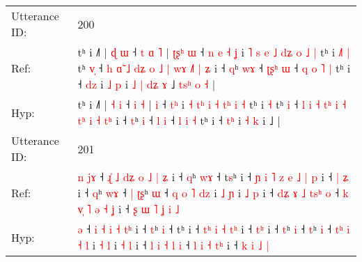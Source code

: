 \documentclass[10pt]{article}
\DeclareRobustCommand{\hl}[1]{{\textcolor{red}{#1}}}
\begin{document}
\begin{longtable}{ll}
 \\
\midrule
Utterance ID: & 200 \\
Ref: & tʰ i ˩˥ | \hl{ɖ} \hl{ɯ} ˧\hl{ }\hl{t} \hl{ɑ} \hl{˥} |\hl{ }\hl{ʈ}\hl{ʂ}\hl{ʰ} \hl{ɯ} ˧\hl{ }\hl{n}\hl{ }\hl{e} \hl{˧}\hl{ }\hl{ʝ} i \hl{˥} \hl{s}\hl{ }\hl{e} \hl{˩} \hl{d}\hl{ʑ}\hl{ }\hl{o} \hl{˩} \hl{|} tʰ i\hl{ }\hl{˩}\hl{˥} \hl{|} tʰ \hl{v}\hl{̩} ˧ \hl{h} \hl{ɑ}\hl{̃} \hl{˩} \hl{d}\hl{ʑ} \hl{o} \hl{˩} \hl{|}\hl{ }\hl{w}\hl{ɤ} \hl{˩}\hl{˥} \hl{|}\hl{ }\hl{ʑ} i ˧ \hl{q}ʰ \hl{w}\hl{ɤ} ˧ \hl{ʈ}\hl{ʂ}\hl{ʰ} \hl{ɯ} ˧\hl{ }\hl{q} \hl{o} \hl{˥} \hl{|} tʰ i ˧ \hl{d}\hl{z} i \hl{˩} \hl{p} i\hl{ }\hl{˩}\hl{ }\hl{|}\hl{ }\hl{d}\hl{ʑ}\hl{ }\hl{ɤ} ˩\hl{ }\hl{t}\hl{s}\hl{ʰ}\hl{ }\hl{o}\hl{ }\hl{˧} |
 \\
Hyp: & tʰ i ˩˥ | \hl{˧} \hl{i} ˧\hl{}\hl{} \hl{i} \hl{˧} |\hl{}\hl{}\hl{}\hl{} \hl{i} ˧\hl{}\hl{}\hl{}\hl{} \hl{}\hl{t}\hl{ʰ} i \hl{˧} \hl{}\hl{t}\hl{ʰ} \hl{i} \hl{˧}\hl{ }\hl{t}\hl{ʰ} \hl{i} \hl{˧} tʰ i\hl{}\hl{}\hl{} \hl{˧} tʰ \hl{}\hl{i} ˧ \hl{l} \hl{}\hl{i} \hl{˧} \hl{t}\hl{ʰ} \hl{i} \hl{˧} \hl{t}\hl{ʰ}\hl{ }\hl{i} \hl{}\hl{˧} \hl{}\hl{t}\hl{ʰ} i ˧ \hl{t}ʰ \hl{}\hl{i} ˧ \hl{}\hl{}\hl{l} \hl{i} ˧\hl{}\hl{} \hl{l} \hl{i} \hl{˧} tʰ i ˧ \hl{t}\hl{ʰ} i \hl{˧} \hl{k} i\hl{}\hl{}\hl{}\hl{}\hl{}\hl{}\hl{}\hl{}\hl{} ˩\hl{}\hl{}\hl{}\hl{}\hl{}\hl{}\hl{}\hl{} |
 \\
\midrule
Utterance ID: & 201 \\
Ref: & \hl{n}\hl{ }\hl{j}\hl{ɤ} ˧\hl{ }\hl{ɻ}\hl{̍} \hl{˩} \hl{d}\hl{ʑ} \hl{o} \hl{˩} \hl{|}\hl{ }\hl{ʑ} i ˧ \hl{q}ʰ \hl{w}\hl{ɤ} ˧ t\hl{s}ʰ i ˧\hl{ }\hl{ɲ}\hl{ }\hl{i} \hl{˥}\hl{ }\hl{z} \hl{e} \hl{˩} \hl{|}\hl{ }\hl{p} i ˧ \hl{|}\hl{ }\hl{ʑ} i ˧ \hl{q}ʰ \hl{w}\hl{ɤ} ˧\hl{ }\hl{|} \hl{ʈ}\hl{ʂ}ʰ \hl{ɯ} ˧ \hl{}\hl{q} \hl{o} \hl{˥} \hl{d}\hl{z} i \hl{˩} \hl{ɲ} i \hl{˩} \hl{p} i ˧ \hl{d}\hl{ʑ} \hl{ɤ} \hl{˩} \hl{t}\hl{s}\hl{ʰ} \hl{o} ˧\hl{ }\hl{k} \hl{v}\hl{̩} \hl{˥} \hl{ə} \hl{˧}\hl{ }\hl{ʝ} i ˧\hl{ }\hl{ʂ}\hl{ }\hl{ɯ} \hl{˥} \hl{ʝ} \hl{i} \hl{˩}
 \\
Hyp: & \hl{}\hl{}\hl{}\hl{ə} ˧\hl{}\hl{}\hl{} \hl{i} \hl{}\hl{˧} \hl{i} \hl{˧} \hl{}\hl{t}\hl{ʰ} i ˧ \hl{t}ʰ \hl{}\hl{i} ˧ t\hl{}ʰ i ˧\hl{}\hl{}\hl{}\hl{} \hl{}\hl{t}\hl{ʰ} \hl{i} \hl{˧} \hl{}\hl{t}\hl{ʰ} i ˧ \hl{}\hl{t}\hl{ʰ} i ˧ \hl{t}ʰ \hl{}\hl{i} ˧\hl{}\hl{} \hl{}\hl{t}ʰ \hl{i} ˧ \hl{t}\hl{ʰ} \hl{i} \hl{˧} \hl{}\hl{l} i \hl{˧} \hl{l} i \hl{˧} \hl{l} i ˧ \hl{}\hl{l} \hl{i} \hl{˧} \hl{}\hl{}\hl{l} \hl{i} ˧\hl{}\hl{} \hl{}\hl{l} \hl{i} \hl{˧} \hl{}\hl{t}\hl{ʰ} i ˧\hl{}\hl{}\hl{}\hl{} \hl{k} \hl{i} \hl{˩} \hl{|}
 \\
\midrule

\end{longtable}
\end{document}

